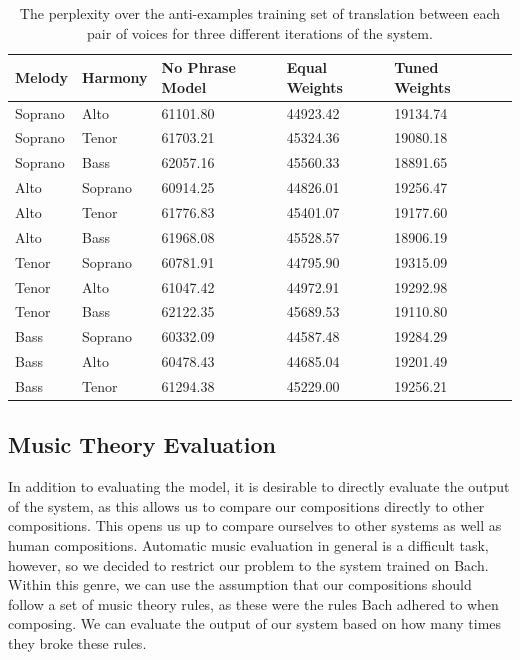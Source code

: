 \documentclass{sig-alternate}
\begin{document}
\begin{table}[t]
      \begin{tabular}{| l | l | l | l | l | l |}
      \hline
     Melody & Harmony & No Phrase Model & Equal Weights & Tuned Weights \\ \hline
     Soprano & Alto & 61101.80 & 44923.42 & 19134.74 \\ 
     Soprano & Tenor & 61703.21 & 45324.36 & 19080.18 \\ 
     Soprano & Bass & 62057.16 & 45560.33 & 18891.65 \\ 
     Alto & Soprano & 60914.25 & 44826.01 & 19256.47 \\ 
     Alto & Tenor & 61776.83 & 45401.07 & 19177.60 \\ 
     Alto & Bass & 61968.08 & 45528.57 & 18906.19 \\ 
     Tenor & Soprano & 60781.91 & 44795.90 & 19315.09 \\ 
     Tenor & Alto & 61047.42 & 44972.91 & 19292.98 \\ 
     Tenor & Bass & 62122.35 & 45689.53 & 19110.80 \\ 
     Bass & Soprano & 60332.09 & 44587.48 & 19284.29 \\ 
     Bass & Alto & 60478.43 & 44685.04 & 19201.49 \\ 
     Bass & Tenor & 61294.38 & 45229.00 & 19256.21 \\ \hline
        \end{tabular}
  \caption{The perplexity over the anti-examples training set of translation between each pair of voices for three different iterations of the system.}
\end{table}


\subsection{Music Theory Evaluation}

In addition to evaluating the model, it is desirable to directly evaluate the output of the system, as this allows us to compare our compositions directly to other compositions. This opens us up to compare ourselves to other systems as well as human compositions. Automatic music evaluation in general is a difficult task, however, so we decided to restrict our problem to the system trained on Bach. Within this genre, we can use the assumption that our compositions should follow a set of music theory rules, as these were the rules Bach adhered to when composing. We can evaluate the output of our system based on how many times they broke these rules.
\end{document}
